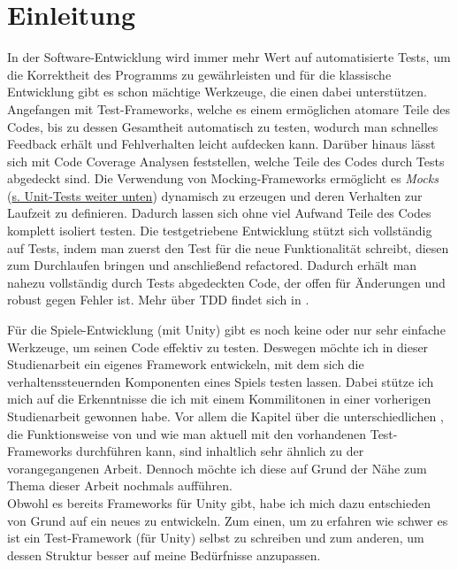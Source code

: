 \chapter{Einleitung}

In der Software-Entwicklung wird immer mehr Wert auf automatisierte Tests, um die Korrektheit des Programms zu gewährleisten und für die klassische Entwicklung gibt es schon mächtige Werkzeuge, die einen dabei unterstützen. Angefangen mit Test-Frameworks, welche es einem ermöglichen atomare Teile des Codes, bis zu dessen Gesamtheit automatisch zu testen, wodurch man schnelles Feedback erhält und Fehlverhalten leicht aufdecken kann. Darüber hinaus lässt sich mit Code Coverage Analysen feststellen, welche Teile des Codes durch Tests abgedeckt sind. Die Verwendung von Mocking-Frameworks ermöglicht es \textit{Mocks} (\hyperlink{DefinitionMock}{s. Unit-Tests weiter unten}) dynamisch zu erzeugen und deren Verhalten zur Laufzeit zu definieren. Dadurch lassen sich ohne viel Aufwand Teile des Codes komplett isoliert testen. Die testgetriebene Entwicklung stützt sich vollständig auf Tests, indem man zuerst den Test für die neue Funktionalität schreibt, diesen zum Durchlaufen bringen und anschließend refactored. Dadurch erhält man nahezu vollständig durch Tests abgedeckten Code, der offen für Änderungen und robust gegen Fehler ist. Mehr über TDD findet sich in \cite{FRE10}.

Für die Spiele-Entwicklung (mit Unity) gibt es noch keine oder nur sehr einfache Werkzeuge, um seinen Code effektiv zu testen. Deswegen möchte ich in dieser Studienarbeit ein eigenes Framework entwickeln, mit dem sich die verhaltenssteuernden Komponenten eines Spiels testen lassen. Dabei stütze ich mich auf die Erkenntnisse die ich mit einem Kommilitonen in einer vorherigen Studienarbeit \cite{TDGD13} gewonnen habe. Vor allem die Kapitel über die unterschiedlichen , die Funktionsweise von  und wie man aktuell  mit den vorhandenen Test-Frameworks durchführen kann, sind inhaltlich sehr ähnlich zu der vorangegangenen Arbeit. Dennoch möchte ich diese auf Grund der Nähe zum Thema dieser Arbeit nochmals aufführen.\\
Obwohl es bereits Frameworks für Unity gibt, habe ich mich dazu entschieden von Grund auf ein neues zu entwickeln. Zum einen, um zu erfahren wie schwer es ist ein Test-Framework (für Unity) selbst zu schreiben und zum anderen, um dessen Struktur besser auf meine Bedürfnisse anzupassen.

